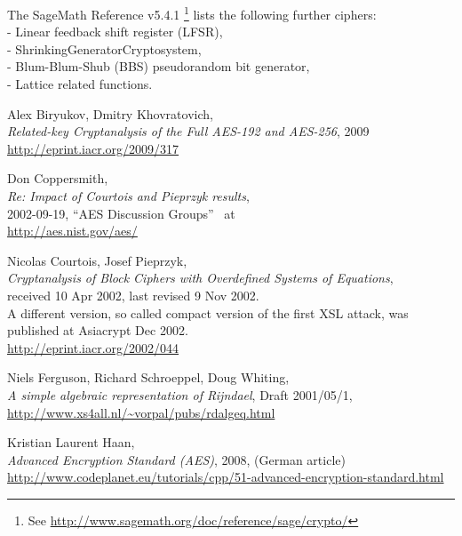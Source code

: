 The SageMath Reference v5.4.1%
\footnote{
See \url{http://www.sagemath.org/doc/reference/sage/crypto/}
}
lists the following further ciphers:\\ 
- Linear feedback shift register (LFSR),\\
- ShrinkingGeneratorCryptosystem,\\
- Blum-Blum-Shub (BBS) pseudorandom bit generator,\\
- Lattice related functions.




\newpage
\begin{thebibliography}{99999}

 
	Alex Biryukov, Dmitry Khovratovich, \\
	{\em Related-key Cryptanalysis of the Full AES-192 and AES-256},
	2009 \\
	\url{http://eprint.iacr.org/2009/317}

  
        Don Coppersmith, \\
        {\em Re: Impact of Courtois and Pieprzyk results}, \\
        2002-09-19, ``AES Discussion Groups''~ at \\
        \url{http://aes.nist.gov/aes/}

  
        Nicolas Courtois, Josef Pieprzyk, \\
        {\em Cryptanalysis of Block Ciphers with Overdefined Systems
             of Equations}, \\
        received 10 Apr 2002, last revised 9 Nov 2002.\\
        A different version, so called compact version of the first XSL attack,
        was published at Asiacrypt Dec 2002. \\
        \url{http://eprint.iacr.org/2002/044}

  
       Niels Ferguson, Richard Schroeppel, Doug Whiting, \\
       {\em A simple algebraic representation of Rijndael}, 
       Draft 2001/05/1, \\
       \url{http://www.xs4all.nl/~vorpal/pubs/rdalgeq.html}

  
       Kristian Laurent Haan, \\
       {\em Advanced Encryption Standard (AES)},
       2008, (German article)\\
       \url{http://www.codeplanet.eu/tutorials/cpp/51-advanced-encryption-standard.html}


\end{thebibliography}
